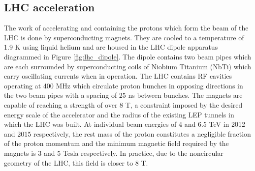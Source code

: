 \subsection{LHC acceleration}
The work of accelerating and containing
 the protons which %
 form %
 the beam of
 the LHC is done by superconducting magnets. 
They are cooled to a temperature of 1.9 K
 using liquid helium and are housed in the
 LHC dipole apparatus diagrammed in Figure \ref{fig:lhc_dipole}.
The dipole contains two beam pipes which are
 each surrounded by superconducting coils
 of Niobium Titanium (NbTi)
 which carry oscillating currents when in operation.
The LHC contains RF cavities
 operating at 400 MHz which 
 circulate proton
 bunches in opposing directions 
 in the two beam pipes
 with a spacing of 25 ns between bunches.
The magnets are capable of reaching 
 a strength of over 8 T, a constraint
 imposed by the desired energy scale 
 of the accelerator and the radius of the
 existing LEP tunnels
 in which the LHC was built.  
At individual beam energies of 4 and 6.5 TeV
 in 2012 and 2015 respectively,
 the rest mass of the proton constitutes
 a negligible fraction of the proton momentum
 and the minimum magnetic field required by the
 magnets is 3 and 5 Tesla respectively.
In practice, due to the noncircular
 geometry of the LHC, this field is closer
 to 8 T.
 
